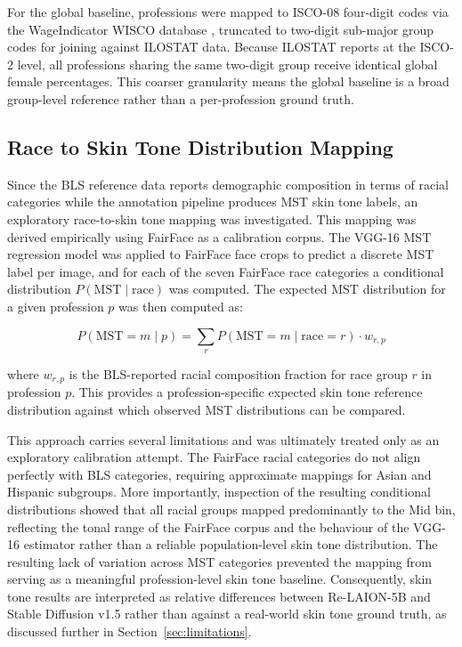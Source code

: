 For the global baseline, professions were mapped to ISCO-08 four-digit codes via the WageIndicator WISCO database \cite{WageIndicator_WISCO}, truncated to two-digit sub-major group codes for joining against ILOSTAT data. Because ILOSTAT reports at the ISCO-2 level, all professions sharing the same two-digit group receive identical global female percentages. This coarser granularity means the global baseline is a broad group-level reference rather than a per-profession ground truth.

\subsection{Race to Skin Tone Distribution Mapping}
\label{subsec:race_to_mst}

Since the BLS reference data reports demographic composition in terms of racial categories while the annotation pipeline produces MST skin tone labels, an exploratory race-to-skin tone mapping was investigated. This mapping was derived empirically using FairFace \cite{Karkkainen_2021_FairFace} as a calibration corpus. The VGG-16 MST regression model was applied to FairFace face crops to predict a discrete MST label per image, and for each of the seven FairFace race categories a conditional distribution $P(\text{MST} \mid \text{race})$ was computed. The expected MST distribution for a given profession $p$ was then computed as:

\begin{equation}
	P(\text{MST} = m \mid p) = \sum_{r} P(\text{MST} = m \mid \text{race} = r)
	\cdot w_{r,p}
	\label{eq:mst_reference}
\end{equation}

where $w_{r,p}$ is the BLS-reported racial composition fraction for race group $r$ in profession $p$. This provides a profession-specific expected skin tone reference distribution against which observed MST distributions can be compared.

This approach carries several limitations and was ultimately treated only as an exploratory calibration attempt. The FairFace racial categories do not align perfectly with BLS categories, requiring approximate mappings for Asian and Hispanic subgroups. More importantly, inspection of the resulting conditional distributions showed that all racial groups mapped predominantly to the Mid bin, reflecting the tonal range of the FairFace corpus and the behaviour of the VGG-16 estimator rather than a reliable population-level skin tone distribution. The resulting lack of variation across MST categories prevented the mapping from serving as a meaningful profession-level skin tone baseline. Consequently, skin tone results are interpreted as relative differences between Re-LAION-5B and Stable Diffusion v1.5 rather than against a real-world skin tone ground truth, as discussed further in Section~\ref{sec:limitations}.

